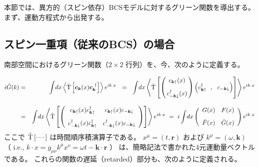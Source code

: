 \documentclass[uplatex,a4j,12pt,dvipdfmx]{jsarticle}
\begin{document}
本節では、異方的（スピン依存）BCSモデルに対するグリーン関数を導出する。
まず、運動方程式から出発する。
\subsection{スピン一重項（従来のBCS）の場合}

南部空間におけるグリーン関数（$2 \times 2$ 行列）を、今、次のように定義する。

\begin{eqnarray}
	i \hat{G}(k)
	&=&
	\int \! dx
	\left\langle \hat{\rm T} \left[ \bm{c}_{\bm{k}}(x) \bm{c}_{\bm{k}}^{\ \dagger} \right] \right\rangle
	e^{ i k \cdot x }
	\ \ = \ \
	\int \! dx
	\left\langle \hat{\rm T} \left[
		\left(
		\!\!
		\begin{array}{c}
				c_{\bm{k} \uparrow}(x)
				\\[3mm]
				c_{-\bm{k} \downarrow}^{\dagger}(x)
			\end{array}
		\!\!
		\right)
		\left( c_{\bm{k} \uparrow}^{\dagger} \ \ , \ \ c_{-\bm{k} \downarrow} \right)
		\right]
	\right\rangle
	e^{ i k \cdot x }
	\nonumber \\[3mm] &=&
	\int \! dx
	\left\langle \hat{\rm T} \left[
		\left(
		\begin{array}{cc}
			c_{\bm{k}\uparrow}(x) c_{\bm{k}\uparrow}^{\dagger}              & c_{\bm{k}\uparrow}(x) c_{-\bm{k}\downarrow}
			\\[3mm]
			c_{-\bm{k}\downarrow}^{\dagger}(x) c_{\bm{k}\uparrow}^{\dagger} & c_{-\bm{k}\downarrow}^{\dagger}(x) c_{-\bm{k}\downarrow}
		\end{array}
		\right)
		\right] \right\rangle
	e^{ i k \cdot x }
	\ = \
	i
	\int \! dx
	\left(
	\begin{array}{cc}
			G(x)       & F(x)
			\\[3mm]
			\bar{F}(x) & \bar{G}(x)
		\end{array}
	\right)
	e^{ i k \cdot x }
\end{eqnarray}
%
ここで $\hat{\rm T} \left[ \cdots \right]$ は時間順序積演算子である。
$x^{\mu}=(t,\bm{r})$ および $k^{\mu}=(\omega,\bm{k})$
（ i.e., $k \cdot x = g_{\mu \nu} k^{\mu} x^{\nu} = \omega t- \bm{k} \cdot \bm{r}$ ）
は、簡略記法で書かれた4元運動量ベクトルである。
これらの関数の遅延（retarded）部分も、次のように定義される。
\end{document}
